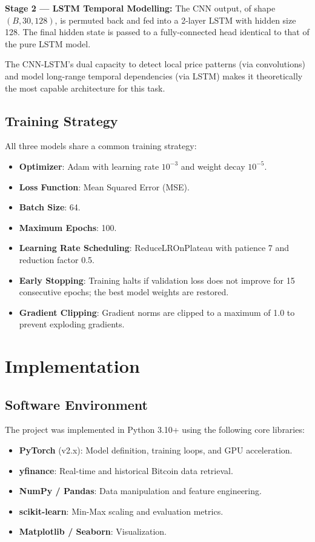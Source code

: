 \documentclass[12pt]{article}
\begin{document}
\textbf{Stage 2 --- LSTM Temporal Modelling:} The CNN output, of shape $(B, 30, 128)$, is permuted back and fed into a 2-layer LSTM with hidden size 128. The final hidden state is passed to a fully-connected head identical to that of the pure LSTM model.

The CNN-LSTM's dual capacity to detect local price patterns (via convolutions) and model long-range temporal dependencies (via LSTM) makes it theoretically the most capable architecture for this task.

\subsection{Training Strategy}

All three models share a common training strategy:
\begin{itemize}[leftmargin=*]
    \item \textbf{Optimizer}: Adam with learning rate $10^{-3}$ and weight decay $10^{-5}$.
    \item \textbf{Loss Function}: Mean Squared Error (MSE).
    \item \textbf{Batch Size}: 64.
    \item \textbf{Maximum Epochs}: 100.
    \item \textbf{Learning Rate Scheduling}: ReduceLROnPlateau with patience 7 and reduction factor 0.5.
    \item \textbf{Early Stopping}: Training halts if validation loss does not improve for 15 consecutive epochs; the best model weights are restored.
    \item \textbf{Gradient Clipping}: Gradient norms are clipped to a maximum of 1.0 to prevent exploding gradients.
\end{itemize}

\section{Implementation}

\subsection{Software Environment}

The project was implemented in Python 3.10+ using the following core libraries:

\begin{itemize}[leftmargin=*]
    \item \textbf{PyTorch} (v2.x): Model definition, training loops, and GPU acceleration.
    \item \textbf{yfinance}: Real-time and historical Bitcoin data retrieval.
    \item \textbf{NumPy / Pandas}: Data manipulation and feature engineering.
    \item \textbf{scikit-learn}: Min-Max scaling and evaluation metrics.
    \item \textbf{Matplotlib / Seaborn}: Visualization.
\end{itemize}
\end{document}
